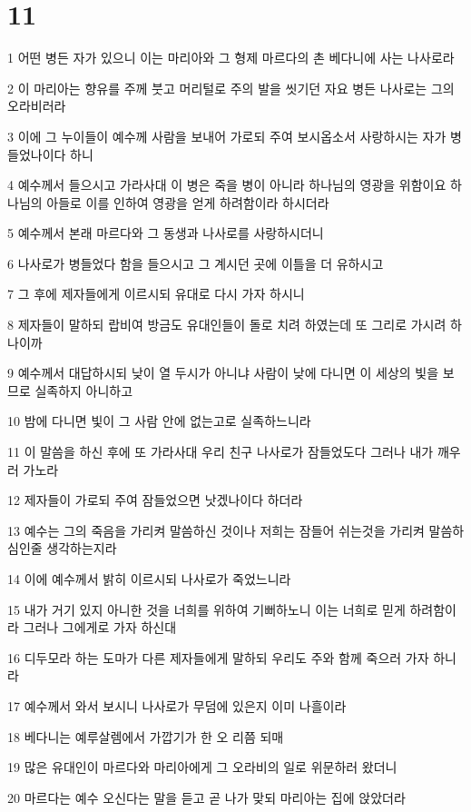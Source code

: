 \chapter{11}

\par 1 어떤 병든 자가 있으니 이는 마리아와 그 형제 마르다의 촌 베다니에 사는 나사로라
\par 2 이 마리아는 향유를 주께 붓고 머리털로 주의 발을 씻기던 자요 병든 나사로는 그의 오라비러라
\par 3 이에 그 누이들이 예수께 사람을 보내어 가로되 주여 보시옵소서 사랑하시는 자가 병들었나이다 하니
\par 4 예수께서 들으시고 가라사대 이 병은 죽을 병이 아니라 하나님의 영광을 위함이요 하나님의 아들로 이를 인하여 영광을 얻게 하려함이라 하시더라
\par 5 예수께서 본래 마르다와 그 동생과 나사로를 사랑하시더니
\par 6 나사로가 병들었다 함을 들으시고 그 계시던 곳에 이틀을 더 유하시고
\par 7 그 후에 제자들에게 이르시되 유대로 다시 가자 하시니
\par 8 제자들이 말하되 랍비여 방금도 유대인들이 돌로 치려 하였는데 또 그리로 가시려 하나이까
\par 9 예수께서 대답하시되 낮이 열 두시가 아니냐 사람이 낮에 다니면 이 세상의 빛을 보므로 실족하지 아니하고
\par 10 밤에 다니면 빛이 그 사람 안에 없는고로 실족하느니라
\par 11 이 말씀을 하신 후에 또 가라사대 우리 친구 나사로가 잠들었도다 그러나 내가 깨우러 가노라
\par 12 제자들이 가로되 주여 잠들었으면 낫겠나이다 하더라
\par 13 예수는 그의 죽음을 가리켜 말씀하신 것이나 저희는 잠들어 쉬는것을 가리켜 말씀하심인줄 생각하는지라
\par 14 이에 예수께서 밝히 이르시되 나사로가 죽었느니라
\par 15 내가 거기 있지 아니한 것을 너희를 위하여 기뻐하노니 이는 너희로 믿게 하려함이라 그러나 그에게로 가자 하신대
\par 16 디두모라 하는 도마가 다른 제자들에게 말하되 우리도 주와 함께 죽으러 가자 하니라
\par 17 예수께서 와서 보시니 나사로가 무덤에 있은지 이미 나흘이라
\par 18 베다니는 예루살렘에서 가깝기가 한 오 리쯤 되매
\par 19 많은 유대인이 마르다와 마리아에게 그 오라비의 일로 위문하러 왔더니
\par 20 마르다는 예수 오신다는 말을 듣고 곧 나가 맞되 마리아는 집에 앉았더라
